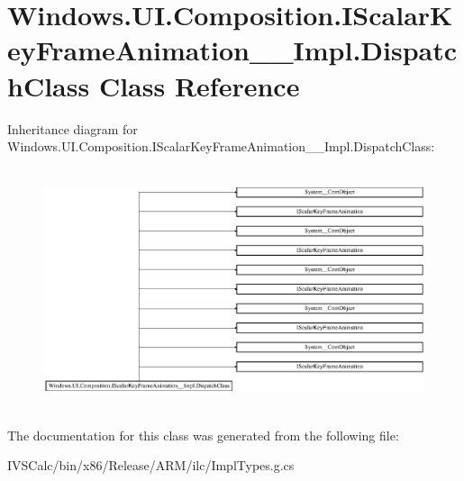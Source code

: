 \hypertarget{class_windows_1_1_u_i_1_1_composition_1_1_i_scalar_key_frame_animation_____impl_1_1_dispatch_class}{}\section{Windows.\+U\+I.\+Composition.\+I\+Scalar\+Key\+Frame\+Animation\+\_\+\+\_\+\+Impl.\+Dispatch\+Class Class Reference}
\label{class_windows_1_1_u_i_1_1_composition_1_1_i_scalar_key_frame_animation_____impl_1_1_dispatch_class}
Inheritance diagram for Windows.\+U\+I.\+Composition.\+I\+Scalar\+Key\+Frame\+Animation\+\_\+\+\_\+\+Impl.\+Dispatch\+Class\+:\begin{figure}[H]
\begin{center}
\leavevmode
\includegraphics[height=7.096774cm]{class_windows_1_1_u_i_1_1_composition_1_1_i_scalar_key_frame_animation_____impl_1_1_dispatch_class}
\end{center}
\end{figure}


The documentation for this class was generated from the following file\+:\begin{DoxyCompactItemize}
\item 
I\+V\+S\+Calc/bin/x86/\+Release/\+A\+R\+M/ilc/Impl\+Types.\+g.\+cs\end{DoxyCompactItemize}
